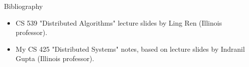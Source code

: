 \documentclass[aspectratio=169]{beamer}
\begin{document}
\begin{frame}[allowframebreaks]{Bibliography}
    \tiny
    \begin{itemize}
        \item CS 539 "Distributed Algorithms" lecture slides by Ling Ren (Illinois professor).
        \item My CS 425 "Distributed Systems" notes, based on lecture slides by Indranil Gupta (Illinois professor).
    \end{itemize}
\end{frame}
\end{document}
